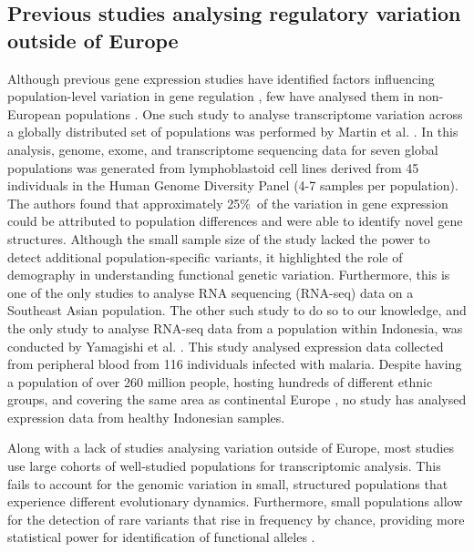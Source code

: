 \documentclass[12pt,a4paper,titlepage,twoside,openright]{book}
\begin{document}
\begin{mainmatter}
{{\section{Previous studies analysing regulatory variation outside of Europe}
Although previous gene expression studies have identified factors influencing population-level variation in gene regulation \cite{battle2014characterizing, westra2013systematic}, few have analysed them in non-European populations \cite{martin2014transcriptome, quach2016genetic}. One such study to analyse transcriptome variation across a globally distributed set of populations was performed by Martin et al. \cite{martin2014transcriptome}. In this analysis, genome, exome, and transcriptome sequencing data for seven global populations was generated from lymphoblastoid cell lines derived from 45 individuals in the Human Genome Diversity Panel (4-7 samples per population). The authors found that approximately 25\%\ of the variation in gene expression could be attributed to population differences and were able to identify novel gene structures. Although the small sample size of the study lacked the power to detect additional population-specific variants, it highlighted the role of demography in understanding functional genetic variation. Furthermore, this is one of the only studies to analyse RNA sequencing (RNA-seq) data on a Southeast Asian population. The other such study to do so to our knowledge, and the only study to analyse RNA-seq data from a population within Indonesia, was conducted by Yamagishi et al. \cite{yamagishi2014interactive}. This study analysed expression data collected from peripheral blood from 116 individuals infected with malaria. Despite having a population of over 260 million people, hosting hundreds of different ethnic groups, and covering the same area as continental Europe \cite{hudjashov2017complex}, no study has analysed expression data from healthy Indonesian samples.

Along with a lack of studies analysing variation outside of Europe, most studies use large cohorts of well-studied populations for transcriptomic analysis. This fails to account for the genomic variation in small, structured populations that experience different evolutionary dynamics. Furthermore, small populations allow for the detection of rare variants that rise in frequency by chance, providing more statistical power for identification of functional alleles \cite{timpson2018genetic}. 

}}
\end{mainmatter}
\end{document}
